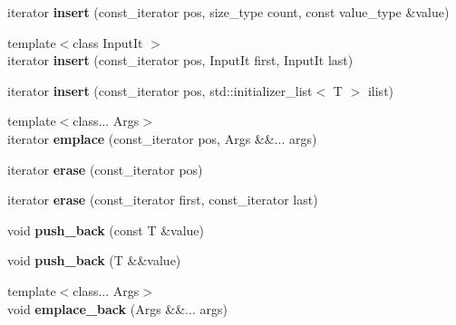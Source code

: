 \begin{DoxyCompactItemize}
\mbox{\label{classdsp_1_1_signal_a1144288c424b008e3d5e7cc4f8730692}} 
iterator {\bfseries insert} (const\+\_\+iterator pos, size\+\_\+type count, const value\+\_\+type \&value)
\item 
\mbox{\label{classdsp_1_1_signal_a0ad444a0ecb053b6b0c0229d60e4736e}} 
{\footnotesize template$<$class Input\+It $>$ }\\iterator {\bfseries insert} (const\+\_\+iterator pos, Input\+It first, Input\+It last)
\item 
\mbox{\label{classdsp_1_1_signal_a7a52cfca66c11728a3dda8c9b4aa4046}} 
iterator {\bfseries insert} (const\+\_\+iterator pos, std\+::initializer\+\_\+list$<$ T $>$ ilist)
\item 
\mbox{\label{classdsp_1_1_signal_a40ccc8fbe9b7d14ceb7eed8e59db1394}} 
{\footnotesize template$<$class... Args$>$ }\\iterator {\bfseries emplace} (const\+\_\+iterator pos, Args \&\&... args)
\item 
\mbox{\label{classdsp_1_1_signal_aa35c4de841b68d10f5b62b61592f9942}} 
iterator {\bfseries erase} (const\+\_\+iterator pos)
\item 
\mbox{\label{classdsp_1_1_signal_a08dc196a18702f43c1b29a7dae6189c1}} 
iterator {\bfseries erase} (const\+\_\+iterator first, const\+\_\+iterator last)
\item 
\mbox{\label{classdsp_1_1_signal_ad762e9f54410371092b0e303359e79f1}} 
void {\bfseries push\+\_\+back} (const T \&value)
\item 
\mbox{\label{classdsp_1_1_signal_a4877a0caf3b6f4fac995034433304e31}} 
void {\bfseries push\+\_\+back} (T \&\&value)
\item 
\mbox{\label{classdsp_1_1_signal_a7feba86c6bdca94c1f45d91c04f6093e}} 
{\footnotesize template$<$class... Args$>$ }\\void {\bfseries emplace\+\_\+back} (Args \&\&... args)
\item 
\mbox{\label{classdsp_1_1_signal_a325122e43ace2458a024b50b422c9e29}} 

\end{DoxyCompactItemize}
